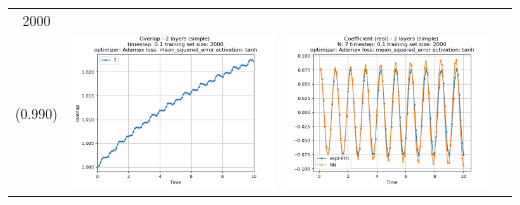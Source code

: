 \documentclass{article}
\begin{document}
\begin{tabular}{|c|c|c|c|} \hline
     2000 \\ (0.990) &
     \includegraphics[scale=0.37]{./Searching_for_good_train_set_size/2_layers_simple_train_samples=2000_timestep=0.1_t_total=10.0_optimizer=Adamax_loss=mean_squared_error_activation=tanh/Overlap.png} &
     \includegraphics[scale=0.37]{./Searching_for_good_train_set_size/2_layers_simple_train_samples=2000_timestep=0.1_t_total=10.0_optimizer=Adamax_loss=mean_squared_error_activation=tanh/Coeff_N=7_(real).png} &

\end{tabular}
\end{document}
